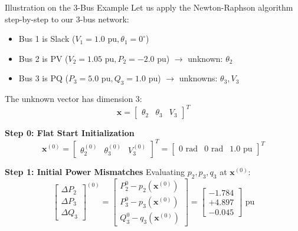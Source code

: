 \begin{frame}[allowframebreaks]{Illustration on the 3-Bus Example}
    Let us apply the Newton-Raphson algorithm step-by-step to our 3-bus network:
    \begin{itemize}
        \item Bus 1 is Slack ($V_1 = 1.0\text{ pu}, \theta_1 = 0^\circ$)
        \item Bus 2 is PV ($V_2 = 1.05\text{ pu}, P_2 = -2.0\text{ pu}$) $\to$ unknown: $\theta_2$
        \item Bus 3 is PQ ($P_3 = 5.0\text{ pu}, Q_3 = 1.0\text{ pu}$) $\to$ unknowns: $\theta_3, V_3$
    \end{itemize}
    
    The unknown vector has dimension 3:
    $$\mathbf{x} = \begin{bmatrix} \theta_2 & \theta_3 & V_3 \end{bmatrix}^T$$
    
    \newpage
    \textbf{Step 0: Flat Start Initialization}
    $$\mathbf{x}^{(0)} = \begin{bmatrix} \theta_2^{(0)} & \theta_3^{(0)} & V_3^{(0)} \end{bmatrix}^T = \begin{bmatrix} 0\text{ rad} & 0\text{ rad} & 1.0\text{ pu} \end{bmatrix}^T$$
    
    \textbf{Step 1: Initial Power Mismatches}
    Evaluating $p_2, p_3, q_3$ at $\mathbf{x}^{(0)}$:
    $$\begin{bmatrix}
        \Delta P_2 \\ \Delta P_3 \\ \Delta Q_3
    \end{bmatrix}^{(0)} = 
    \begin{bmatrix}
        P_2^0 - p_2(\mathbf{x}^{(0)}) \\
        P_3^0 - p_3(\mathbf{x}^{(0)}) \\
        Q_3^0 - q_3(\mathbf{x}^{(0)})
    \end{bmatrix} =
    \begin{bmatrix}
        -1.784 \\ +4.897 \\ -0.045
    \end{bmatrix}\text{ pu}$$
    

\end{frame}
